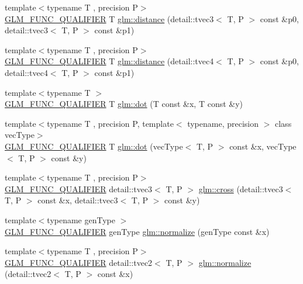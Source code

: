 \begin{DoxyCompactItemize}
{\footnotesize template$<$typename T , precision P$>$ }\\\hyperlink{setup_8hpp_a33fdea6f91c5f834105f7415e2a64407}{G\+L\+M\+\_\+\+F\+U\+N\+C\+\_\+\+Q\+U\+A\+L\+I\+F\+I\+ER} T \hyperlink{namespaceglm_a9e81696018e0d4ec6005f4aa5c159ebb}{glm\+::distance} (detail\+::tvec3$<$ T, P $>$ const \&p0, detail\+::tvec3$<$ T, P $>$ const \&p1)
\item 
{\footnotesize template$<$typename T , precision P$>$ }\\\hyperlink{setup_8hpp_a33fdea6f91c5f834105f7415e2a64407}{G\+L\+M\+\_\+\+F\+U\+N\+C\+\_\+\+Q\+U\+A\+L\+I\+F\+I\+ER} T \hyperlink{namespaceglm_aa4578d64c86a5af614f700eb8a68a732}{glm\+::distance} (detail\+::tvec4$<$ T, P $>$ const \&p0, detail\+::tvec4$<$ T, P $>$ const \&p1)
\item 
{\footnotesize template$<$typename T $>$ }\\\hyperlink{setup_8hpp_a33fdea6f91c5f834105f7415e2a64407}{G\+L\+M\+\_\+\+F\+U\+N\+C\+\_\+\+Q\+U\+A\+L\+I\+F\+I\+ER} T \hyperlink{namespaceglm_a1998fa8aa0ed2caf8cb050bf8ca594eb}{glm\+::dot} (T const \&x, T const \&y)
\item 
{\footnotesize template$<$typename T , precision P, template$<$ typename, precision $>$ class vec\+Type$>$ }\\\hyperlink{setup_8hpp_a33fdea6f91c5f834105f7415e2a64407}{G\+L\+M\+\_\+\+F\+U\+N\+C\+\_\+\+Q\+U\+A\+L\+I\+F\+I\+ER} T \hyperlink{group__core__func__geometric_ga7dada304da2ba7dd3376ab4f178c3f6b}{glm\+::dot} (vec\+Type$<$ T, P $>$ const \&x, vec\+Type$<$ T, P $>$ const \&y)
\item 
{\footnotesize template$<$typename T , precision P$>$ }\\\hyperlink{setup_8hpp_a33fdea6f91c5f834105f7415e2a64407}{G\+L\+M\+\_\+\+F\+U\+N\+C\+\_\+\+Q\+U\+A\+L\+I\+F\+I\+ER} detail\+::tvec3$<$ T, P $>$ \hyperlink{group__core__func__geometric_ga89b91c2a256cfb62ecbc589d1ee36d3c}{glm\+::cross} (detail\+::tvec3$<$ T, P $>$ const \&x, detail\+::tvec3$<$ T, P $>$ const \&y)
\item 
{\footnotesize template$<$typename gen\+Type $>$ }\\\hyperlink{setup_8hpp_a33fdea6f91c5f834105f7415e2a64407}{G\+L\+M\+\_\+\+F\+U\+N\+C\+\_\+\+Q\+U\+A\+L\+I\+F\+I\+ER} gen\+Type \hyperlink{group__core__func__geometric_ga15aa87101457e41663b08a8dcc3357f8}{glm\+::normalize} (gen\+Type const \&x)
\item 
{\footnotesize template$<$typename T , precision P$>$ }\\\hyperlink{setup_8hpp_a33fdea6f91c5f834105f7415e2a64407}{G\+L\+M\+\_\+\+F\+U\+N\+C\+\_\+\+Q\+U\+A\+L\+I\+F\+I\+ER} detail\+::tvec2$<$ T, P $>$ \hyperlink{namespaceglm_a3cdf867b5e7051372a7d4ba81fbf830c}{glm\+::normalize} (detail\+::tvec2$<$ T, P $>$ const \&x)

\end{DoxyCompactItemize}
